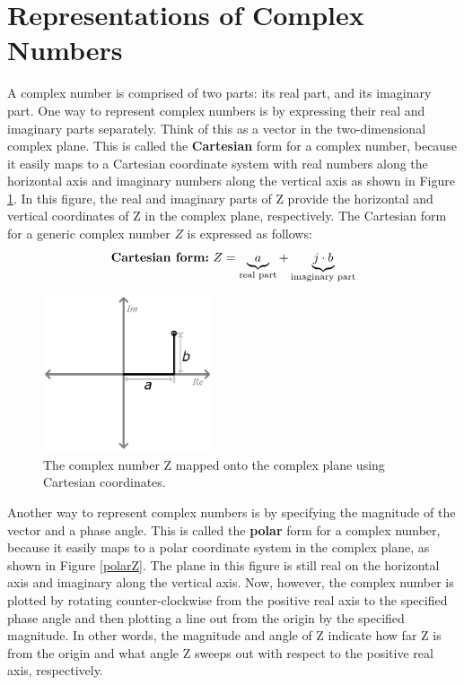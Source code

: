 \section{Representations of Complex Numbers}
A complex number is comprised of two parts: its real part, and its imaginary part. One way to represent complex numbers is by expressing their real and imaginary parts separately. Think of this as a vector in the two-dimensional complex plane. This is called the \textbf{Cartesian} form for a complex number, because it easily maps to a Cartesian coordinate system with real numbers along the horizontal axis and imaginary numbers along the vertical axis as shown in Figure \ref{cartesianZ}. In this figure, the real and imaginary parts of Z provide the horizontal and vertical coordinates of Z in the complex plane, respectively. The Cartesian form for a generic complex number $Z$ is expressed as follows:
$$
\textbf{Cartesian form:}\textnormal{                         }Z=\underbrace{a}_{\textnormal{real part}} + \underbrace{j\cdot b}_{\textnormal{imaginary part}}
$$
\begin{figure}[h!]
\centering
\includegraphics[width=5cm]{figures/ZCartesian.png}
\caption{The complex number Z mapped onto the complex plane using Cartesian coordinates.}
\label{cartesianZ}
\end{figure}
\par
Another way to represent complex numbers is by specifying the magnitude of the vector and a phase angle. This is called the \textbf{polar} form for a complex number, because it easily maps to a polar coordinate system in the complex plane, as shown in Figure \ref{polarZ}. The plane in this figure is still real on the horizontal axis and imaginary along the vertical axis. Now, however, the complex number is plotted by rotating counter-clockwise from the positive real axis to the specified phase angle and then plotting a line out from the origin by the specified magnitude. In other words, the magnitude and angle of Z indicate how far Z is from the origin and what angle Z sweeps out with respect to the positive real axis, respectively. 
